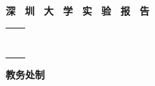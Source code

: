 \documentclass[a4paper,12pt]{article}
\begin{document}
\begin{titlepage}
    \centering
    \vspace*{2cm}
    {\Huge\textbf{深 \ 圳 \ 大 \ 学 \ 实 \ 验 \ 报 \ 告}\par}
    \vspace{1.5cm}

    \newcommand{\coverlabel}[1]{\makebox[3.2cm][s]{\textbf{#1}}}
    \newcommand{\covervalue}[1]{\underline{\makebox[8cm][c]{\strut #1}}}
    {\Large
    \begin{tabular}{@{}l@{\hspace{0.4cm}}l@{}}
        \coverlabel{课\hfill 程\hfill 名\hfill 称} &
        \covervalue{Python程序设计} \\[0.5cm]
        \coverlabel{项\hfill 目\hfill 名\hfill 称} &
        \covervalue{小项目一} \\[0.5cm]
        \coverlabel{学\hfill 院} &
        \covervalue{人工智能学院} \\[0.5cm]
        \coverlabel{专\hfill 业} &
        \covervalue{人工智能（IEEE荣誉班）} \\[0.5cm]
        \coverlabel{指\hfill 导\hfill 教\hfill 师} &
        \covervalue{舒婷} \\[0.5cm]
        \coverlabel{报\hfill 告\hfill 人} &
        \makebox[8cm][l]{%
            \underline{\makebox[3cm][c]{\strut 胡楷}}%
            \hspace{0.4cm}%
            \makebox[1.2cm][c]{\textbf{学号}}%
            \underline{\makebox[3.4cm][c]{\strut 2025681097}}%
        } \\[0.5cm]
        \coverlabel{实\hfill 验\hfill 时\hfill 间} &
        \covervalue{2026/11/18} \\[0.5cm]
        \coverlabel{提\hfill 交\hfill 时\hfill 间} &
        \covervalue{2026/11/25}
    \end{tabular}\par
    }

    \vfill
    {\Large\textbf{教务处制}\par}
\end{titlepage}

\newpage


\setlength{\parindent}{2em}
\setlength{\parskip}{3pt}
\end{document}
